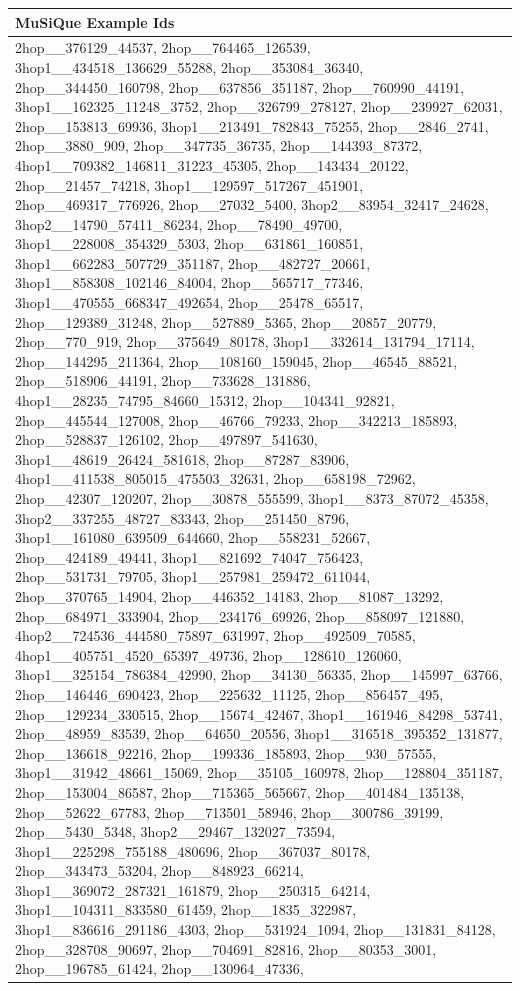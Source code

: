 \documentclass{article} %
\begin{document}
\begin{table}[h!]
    \centering
    \small %
    \begin{tabular}{|p{12cm}|} %
        \hline
        \textbf{MuSiQue Example Ids} \\
        \hline 
\tiny2hop\_\_376129\_44537, 2hop\_\_764465\_126539, 3hop1\_\_434518\_136629\_55288, 2hop\_\_353084\_36340, 2hop\_\_344450\_160798, 2hop\_\_637856\_351187, 2hop\_\_760990\_44191, 3hop1\_\_162325\_11248\_3752, 2hop\_\_326799\_278127, 2hop\_\_239927\_62031, 2hop\_\_153813\_69936, 3hop1\_\_213491\_782843\_75255, 2hop\_\_2846\_2741, 2hop\_\_3880\_909, 2hop\_\_347735\_36735, 2hop\_\_144393\_87372, 4hop1\_\_709382\_146811\_31223\_45305, 2hop\_\_143434\_20122, 2hop\_\_21457\_74218, 3hop1\_\_129597\_517267\_451901, 2hop\_\_469317\_776926, 2hop\_\_27032\_5400, 3hop2\_\_83954\_32417\_24628, 3hop2\_\_14790\_57411\_86234, 2hop\_\_78490\_49700, 3hop1\_\_228008\_354329\_5303, 2hop\_\_631861\_160851, 3hop1\_\_662283\_507729\_351187, 2hop\_\_482727\_20661, 3hop1\_\_858308\_102146\_84004, 2hop\_\_565717\_77346, 3hop1\_\_470555\_668347\_492654, 2hop\_\_25478\_65517, 2hop\_\_129389\_31248, 2hop\_\_527889\_5365, 2hop\_\_20857\_20779, 2hop\_\_770\_919, 2hop\_\_375649\_80178, 3hop1\_\_332614\_131794\_17114, 2hop\_\_144295\_211364, 2hop\_\_108160\_159045, 2hop\_\_46545\_88521, 2hop\_\_518906\_44191, 2hop\_\_733628\_131886, 4hop1\_\_28235\_74795\_84660\_15312, 2hop\_\_104341\_92821, 2hop\_\_445544\_127008, 2hop\_\_46766\_79233, 2hop\_\_342213\_185893, 2hop\_\_528837\_126102, 2hop\_\_497897\_541630, 3hop1\_\_48619\_26424\_581618, 2hop\_\_87287\_83906, 4hop1\_\_411538\_805015\_475503\_32631, 2hop\_\_658198\_72962, 2hop\_\_42307\_120207, 2hop\_\_30878\_555599, 3hop1\_\_8373\_87072\_45358, 3hop2\_\_337255\_48727\_83343, 2hop\_\_251450\_8796, 3hop1\_\_161080\_639509\_644660, 2hop\_\_558231\_52667, 2hop\_\_424189\_49441, 3hop1\_\_821692\_74047\_756423, 2hop\_\_531731\_79705, 3hop1\_\_257981\_259472\_611044, 2hop\_\_370765\_14904, 2hop\_\_446352\_14183, 2hop\_\_81087\_13292, 2hop\_\_684971\_333904, 2hop\_\_234176\_69926, 2hop\_\_858097\_121880, 4hop2\_\_724536\_444580\_75897\_631997, 2hop\_\_492509\_70585, 4hop1\_\_405751\_4520\_65397\_49736, 2hop\_\_128610\_126060, 3hop1\_\_325154\_786384\_42990, 2hop\_\_34130\_56335, 2hop\_\_145997\_63766, 2hop\_\_146446\_690423, 2hop\_\_225632\_11125, 2hop\_\_856457\_495, 2hop\_\_129234\_330515, 2hop\_\_15674\_42467, 3hop1\_\_161946\_84298\_53741, 2hop\_\_48959\_83539, 2hop\_\_64650\_20556, 3hop1\_\_316518\_395352\_131877, 2hop\_\_136618\_92216, 2hop\_\_199336\_185893, 2hop\_\_930\_57555, 3hop1\_\_31942\_48661\_15069, 2hop\_\_35105\_160978, 2hop\_\_128804\_351187, 2hop\_\_153004\_86587, 2hop\_\_715365\_565667, 2hop\_\_401484\_135138, 2hop\_\_52622\_67783, 2hop\_\_713501\_58946, 2hop\_\_300786\_39199, 2hop\_\_5430\_5348, 3hop2\_\_29467\_132027\_73594, 3hop1\_\_225298\_755188\_480696, 2hop\_\_367037\_80178, 2hop\_\_343473\_53204, 2hop\_\_848923\_66214, 3hop1\_\_369072\_287321\_161879, 2hop\_\_250315\_64214, 3hop1\_\_104311\_833580\_61459, 2hop\_\_1835\_322987, 3hop1\_\_836616\_291186\_4303, 2hop\_\_531924\_1094, 2hop\_\_131831\_84128, 2hop\_\_328708\_90697, 2hop\_\_704691\_82816, 2hop\_\_80353\_3001, 2hop\_\_196785\_61424, 2hop\_\_130964\_47336, 
\end{tabular}
\end{table}
\end{document}
